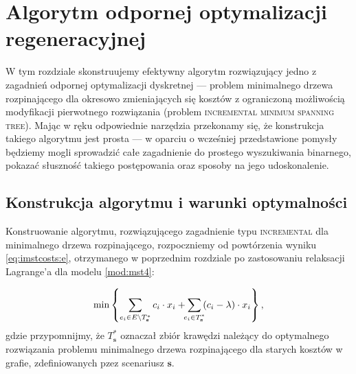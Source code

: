 \chapter{Algorytm odpornej optymalizacji regeneracyjnej}
\thispagestyle{chapterBeginStyle}
\label{ch:binaryIncMST}

W tym rozdziale skonstruujemy efektywny algorytm rozwiązujący jedno z zagadnień odpornej optymalizacji dyskretnej --- problem minimalnego drzewa rozpinającego dla okresowo zmieniających się kosztów z ograniczoną możliwością modyfikacji pierwotnego rozwiązania (problem \textsc{incremental minimum spanning tree}). Mając w ręku odpowiednie narzędzia przekonamy się, że konstrukcja takiego algorytmu jest prosta --- w oparciu o wcześniej przedstawione pomysły będziemy mogli sprowadzić całe zagadnienie do prostego wyszukiwania binarnego, pokazać słuszność takiego postępowania oraz sposoby na jego udoskonalenie.

\section{Konstrukcja algorytmu i warunki optymalności}

Konstruowanie algorytmu, rozwiązującego zagadnienie typu \textsc{incremental} dla minimalnego drzewa rozpinającego, rozpoczniemy od powtórzenia wyniku \ref{eq:imstcosts:e}, otrzymanego w poprzednim rozdziale po zastosowaniu relaksacji Lagrange'a dla modelu \ref{mod:mst4}:

\begin{eqnarray}\label{eq:imstcosts2}
	\min \left\{ \sum_{e_{i} \in E \setminus T^{\ast}_{\textbf{s}}} c_{i} \cdot x_{i} + \sum_{\mathclap{e_{i} \in T^{\ast}_{\textbf{s}}}} \left( c_{i} - \lambda \right) \cdot x_{i} \right\}\text{,}
\end{eqnarray}
gdzie przypomnijmy, że $T^{\ast}_{\textbf{s}}$ oznaczał zbiór krawędzi należący do optymalnego rozwiązania problemu minimalnego drzewa rozpinającego dla starych kosztów w grafie, zdefiniowanych pzez scenariusz $\textbf{s}$.

